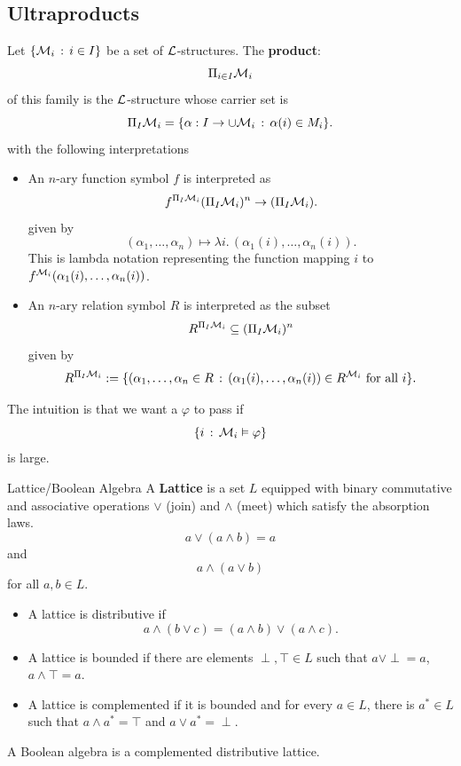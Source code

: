 \documentclass{article}
\numberwithin{thm}{subsection}
\begin{document}
\subsection{Ultraproducts}
\begin{fancydefine}{}
    Let $\{\mathcal{M}_{i} \, : \, i \in I \}$ be a set of $\mathcal{L}$-structures. The \textbf{product}: \[ \Pi_{i \in I} \mathcal{M}_{i} \] of this family is the $\mathcal{L}$-structure whose carrier set is \[ \Pi_{I} \mathcal{M}_{i} = \{ \alpha : I \to \cup \mathcal{M}_{i} \, : \, \alpha(i) \in M_{i} \}. \] with the following interpretations \begin{itemize}
        \item An $n$-ary function symbol $f$ is interpreted as \[ f^{\Pi_{I} \mathcal{M}_{i}}(\Pi_{I} \mathcal{M}_{i})^{n} \to (\Pi_{I} \mathcal{M}_{i}).\] given by \[(\alpha_{1}, \dots, \alpha_{n}) \mapsto \lambda i. \, (\alpha_{1}(i), \dots, \alpha_{n}(i)).\] This is lambda notation representing the function mapping $i$ to $f^{\mathcal{M}_{i}}(\alpha_{1}(i), \dots, \alpha_{n}(i))$.
        \item An $n$-ary relation symbol $R$ is interpreted as the subset \[ R^{\Pi_{I} \mathcal{M}_{i}} \subseteq (\Pi_{I} \mathcal{M}_{i})^{n}\] given by \[ R^{\Pi_{I}\mathcal{M}_{i}} := \{ (\alpha_{1},\dots, \alpha_{n} \in R \, : \, (\alpha_{1}(i), \dots, \alpha_{n}(i)) \in R^{\mathcal{M}_{i}} \text{ for all $i$} \}. \] 
    \end{itemize}
\end{fancydefine}
The intuition is that we want a  $\varphi$ to pass if \[ \{ i \, : \, \mathcal{M}_{i} \vDash \varphi \} \] is large.
\begin{fancydefine}{Lattice/Boolean Algebra}
    A \textbf{Lattice} is a set $L$ equipped with binary commutative and associative operations $\vee$ (join) and $\wedge$ (meet) which satisfy the absorption laws. \[ a \vee (a \wedge b) = a\] and \[ a \wedge (a \vee b) \] for all $a,b \in L$. \begin{itemize}
        \item A lattice is distributive if \[ a \wedge (b \vee c) = (a \wedge b) \vee (a \wedge c).\]
        \item A lattice is bounded if there are elements $\perp, \top \in L$ such that $a \vee \perp = a$, $a \wedge \top =a$.
        \item A lattice is complemented if it is bounded and for every $a \in L$, there is $a^{*} \in L$ such that $a \wedge a^{*} = \top$ and $a \vee a^{*} = \perp$.
    \end{itemize}
    A Boolean algebra is a complemented distributive lattice.
\end{fancydefine}
\end{document}
